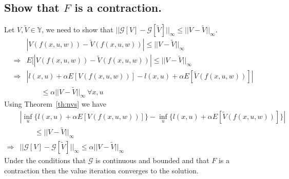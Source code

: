 \subsection{Show that $F$ is a contraction.}
\label{sec:showfcontraction}
Let $V,\tilde{V}\in\mathbb{Y}$, we need to show that $||\mathcal{G}[V]-\mathcal{G}[\tilde{V}]||_\infty \leq ||V-\tilde{V}||_\infty$.
\begin{align*}
&|V(f(x,u,w)) - \tilde{V}(f(x,u,w))| \leq ||V-\tilde{V}||_\infty \\
\Rightarrow &E[|V(f(x,u,w)) - \tilde{V}(f(x,u,w))| \leq ||V-\tilde{V}||_\infty \\
\Rightarrow &|l(x,u)+\alpha E[V(f(x,u,w))] - l(x,u)+\alpha E[\tilde{V}(f(x,u,w))]| \\
&\qquad \leq \alpha||V-\tilde{V}||_\infty~\forall x,u
\end{align*}
Using Theorem~\ref{th:nvs} we have
\begin{align*}
&|\inf_u\{l(x,u)+\alpha E[V(f(x,u,w))]\} - \inf_u\{l(x,u)+\alpha E[\tilde{V}(f(x,u,w))]\}| \\
&\qquad \leq ||V-\tilde{V}||_\infty \\
\Rightarrow &||\mathcal{G}[V]-\mathcal{G}[\tilde{V}]||_\infty \leq \alpha||V-\tilde{V}||_\infty
\end{align*}
Under the conditions that $\mathcal{G}$ is continuous and bounded and that $F$ is a contraction then the value iteration converges to the solution.

